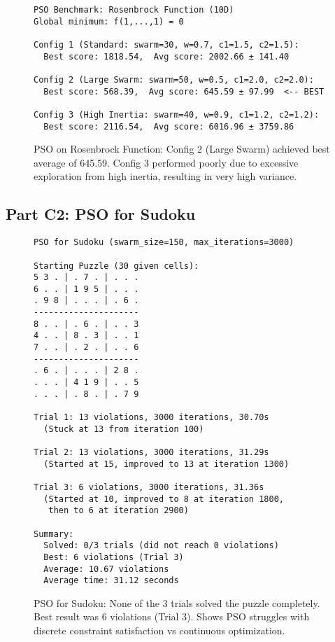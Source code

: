 \documentclass[letterpaper]{article}
\begin{document}
\begin{figure}[h]
\begin{small}
\begin{verbatim}
PSO Benchmark: Rosenbrock Function (10D)
Global minimum: f(1,...,1) = 0

Config 1 (Standard: swarm=30, w=0.7, c1=1.5, c2=1.5):
  Best score: 1818.54,  Avg score: 2002.66 ± 141.40

Config 2 (Large Swarm: swarm=50, w=0.5, c1=2.0, c2=2.0):
  Best score: 568.39,  Avg score: 645.59 ± 97.99  <-- BEST

Config 3 (High Inertia: swarm=40, w=0.9, c1=1.2, c2=1.2):
  Best score: 2116.54,  Avg score: 6016.96 ± 3759.86
\end{verbatim}
\end{small}
\caption{PSO on Rosenbrock Function: Config 2 (Large Swarm) achieved best average of 645.59. Config 3 performed poorly due to excessive exploration from high inertia, resulting in very high variance.}
\label{fig:pso-rosenbrock}
\end{figure}

\subsection{Part C2: PSO for Sudoku}

\begin{figure}[h]
\begin{small}
\begin{verbatim}
PSO for Sudoku (swarm_size=150, max_iterations=3000)

Starting Puzzle (30 given cells):
5 3 . | . 7 . | . . .
6 . . | 1 9 5 | . . .
. 9 8 | . . . | . 6 .
---------------------
8 . . | . 6 . | . . 3
4 . . | 8 . 3 | . . 1
7 . . | . 2 . | . . 6
---------------------
. 6 . | . . . | 2 8 .
. . . | 4 1 9 | . . 5
. . . | . 8 . | . 7 9

Trial 1: 13 violations, 3000 iterations, 30.70s
  (Stuck at 13 from iteration 100)

Trial 2: 13 violations, 3000 iterations, 31.29s
  (Started at 15, improved to 13 at iteration 1300)

Trial 3: 6 violations, 3000 iterations, 31.36s
  (Started at 10, improved to 8 at iteration 1800,
   then to 6 at iteration 2900)

Summary:
  Solved: 0/3 trials (did not reach 0 violations)
  Best: 6 violations (Trial 3)
  Average: 10.67 violations
  Average time: 31.12 seconds
\end{verbatim}
\end{small}
\caption{PSO for Sudoku: None of the 3 trials solved the puzzle completely. Best result was 6 violations (Trial 3). Shows PSO struggles with discrete constraint satisfaction vs continuous optimization.}
\label{fig:pso-sudoku}
\end{figure}



\end{document}
